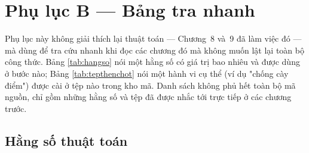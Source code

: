 \chapter{Phụ lục B — Bảng tra nhanh}

Phụ lục này không giải thích lại thuật toán — Chương~8 và~9 đã làm việc đó — mà dùng để
tra cứu nhanh khi đọc các chương đó mà không muốn lật lại toàn bộ công thức. Bảng
\ref{tab:hangso} nói một hằng số có giá trị bao nhiêu và được dùng ở bước nào; Bảng
\ref{tab:tepthenchot} nói một hành vi cụ thể (ví dụ "chống cày điểm") được cài ở tệp nào
trong kho mã. Danh sách không phủ hết toàn bộ mã nguồn, chỉ gồm những hằng số và tệp đã
được nhắc tới trực tiếp ở các chương trước.

\section{Hằng số thuật toán}

